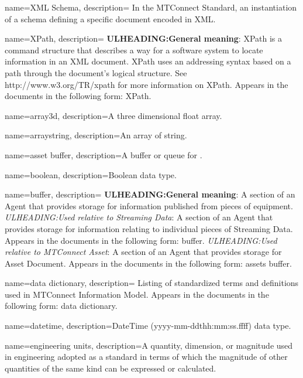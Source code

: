 {
    name={XML Schema},
	description={
	In the MTConnect Standard, an instantiation of a schema defining a specific document encoded in XML.
}
}

{
    name={XPath},
	description={
	\textbf{ULHEADING:General meaning}:
	\gls{XPath} is a command structure that describes a way for a software system to locate information in an XML document.  
	\gls{XPath} uses an addressing syntax based on a path through the document's logical structure. 
	See http://www.w3.org/TR/xpath for more information on \gls{XPath}.
	Appears in the documents in the following form: \gls{XPath}.
}
}

{
    name={array3d},
	description={A three dimensional \gls{float} array.}
}

{
    name={arraystring},
	description={An array of \gls{string}.}
}

{
    name={asset buffer},
	description={A buffer or queue for .}
}

{
    name={boolean},
	description={Boolean data type.}
}

{
    name={buffer},
	description={
  \textbf{ULHEADING:General meaning}:
  A section of an \gls{Agent} that provides storage for information published from pieces of equipment.
  \textit{ULHEADING:Used relative to \gls{Streaming Data}}:
  A section of an \gls{Agent} that provides storage for information relating to individual pieces of \gls{Streaming Data}. 
  Appears in the documents in the following form: \gls{buffer}.
  \textit{ULHEADING:Used relative to \gls{MTConnect Asset}}:
  A section of an \gls{Agent} that provides storage for \gls{Asset Document}.
  Appears in the documents in the following form: \gls{assets buffer}.
}
}

{
    name={data dictionary},
	description={
	Listing of standardized terms and definitions used in \gls{MTConnect Information Model}.
	Appears in the documents in the following form: \gls{data dictionary}.
}
}

{
    name={datetime},
	description={DateTime (yyyy-mm-ddthh:mm:ss.ffff) data type.}
}

{
    name={engineering units},
	description={A quantity, dimension, or magnitude used in engineering adopted as a standard in terms of which the magnitude of other quantities of the same kind can be expressed or calculated.}
}

